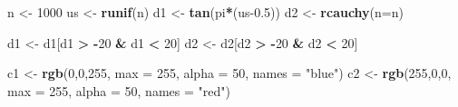 \documentclass[
]{article}
\newenvironment{Shaded}{\begin{snugshade}}{\end{snugshade}}
\newcommand{\AttributeTok}[1]{\textcolor[rgb]{0.13,0.29,0.53}{#1}}
\newcommand{\DecValTok}[1]{\textcolor[rgb]{0.00,0.00,0.81}{#1}}
\newcommand{\FloatTok}[1]{\textcolor[rgb]{0.00,0.00,0.81}{#1}}
\newcommand{\FunctionTok}[1]{\textcolor[rgb]{0.13,0.29,0.53}{\textbf{#1}}}
\newcommand{\NormalTok}[1]{#1}
\newcommand{\OtherTok}[1]{\textcolor[rgb]{0.56,0.35,0.01}{#1}}
\newcommand{\SpecialCharTok}[1]{\textcolor[rgb]{0.81,0.36,0.00}{\textbf{#1}}}
\newcommand{\StringTok}[1]{\textcolor[rgb]{0.31,0.60,0.02}{#1}}
\begin{document}
\begin{Shaded}
\begin{Highlighting}[]
\NormalTok{n }\OtherTok{\textless{}{-}} \DecValTok{1000}
\NormalTok{us }\OtherTok{\textless{}{-}} \FunctionTok{runif}\NormalTok{(n)}
\NormalTok{d1 }\OtherTok{\textless{}{-}} \FunctionTok{tan}\NormalTok{(pi}\SpecialCharTok{*}\NormalTok{(us}\FloatTok{{-}0.5}\NormalTok{))}
\NormalTok{d2 }\OtherTok{\textless{}{-}} \FunctionTok{rcauchy}\NormalTok{(}\AttributeTok{n=}\NormalTok{n)}

\NormalTok{d1 }\OtherTok{\textless{}{-}}\NormalTok{ d1[d1 }\SpecialCharTok{\textgreater{}} \SpecialCharTok{{-}}\DecValTok{20} \SpecialCharTok{\&}\NormalTok{ d1 }\SpecialCharTok{\textless{}} \DecValTok{20}\NormalTok{]}
\NormalTok{d2 }\OtherTok{\textless{}{-}}\NormalTok{ d2[d2 }\SpecialCharTok{\textgreater{}} \SpecialCharTok{{-}}\DecValTok{20} \SpecialCharTok{\&}\NormalTok{ d2 }\SpecialCharTok{\textless{}} \DecValTok{20}\NormalTok{]}

\NormalTok{c1 }\OtherTok{\textless{}{-}} \FunctionTok{rgb}\NormalTok{(}\DecValTok{0}\NormalTok{,}\DecValTok{0}\NormalTok{,}\DecValTok{255}\NormalTok{, }\AttributeTok{max =} \DecValTok{255}\NormalTok{, }\AttributeTok{alpha =} \DecValTok{50}\NormalTok{, }\AttributeTok{names =} \StringTok{"blue"}\NormalTok{)}
\NormalTok{c2 }\OtherTok{\textless{}{-}} \FunctionTok{rgb}\NormalTok{(}\DecValTok{255}\NormalTok{,}\DecValTok{0}\NormalTok{,}\DecValTok{0}\NormalTok{, }\AttributeTok{max =} \DecValTok{255}\NormalTok{, }\AttributeTok{alpha =} \DecValTok{50}\NormalTok{, }\AttributeTok{names =} \StringTok{"red"}\NormalTok{)}


\end{Highlighting}
\end{Shaded}
\end{document}
